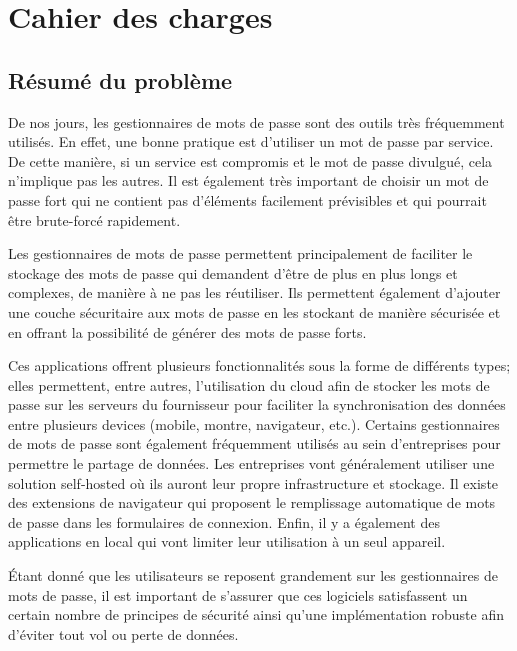 

\chapter{Cahier des charges}



\section*{Résumé du problème}
De nos jours, les gestionnaires de mots de passe sont des outils très fréquemment utilisés. En effet, une bonne pratique est d'utiliser un mot de passe par service. De cette manière, si un service est compromis et le mot de passe divulgué, cela n'implique pas les autres. Il est également très important de choisir un mot de passe fort qui ne contient pas d'éléments facilement prévisibles et qui pourrait être brute-forcé rapidement. 

Les gestionnaires de mots de passe permettent principalement de faciliter le stockage des mots de passe qui demandent d'être de plus en plus longs et complexes, de manière à ne pas les réutiliser. Ils permettent également d'ajouter une couche sécuritaire aux mots de passe en les stockant de manière sécurisée et en offrant la possibilité de générer des mots de passe forts.

Ces applications offrent plusieurs fonctionnalités sous la forme de différents types;  elles permettent, entre autres, l'utilisation du cloud afin de stocker les mots de passe sur les serveurs du fournisseur pour faciliter la synchronisation des données entre plusieurs devices (mobile, montre, navigateur, etc.). Certains gestionnaires de mots de passe sont également fréquemment utilisés au sein d'entreprises pour permettre le partage de données. Les entreprises vont généralement utiliser une solution self-hosted où ils auront leur propre infrastructure et stockage. Il existe des extensions de navigateur  qui proposent le remplissage automatique de mots de passe dans les formulaires de connexion. Enfin, il y a également des applications en local qui vont limiter leur utilisation à un seul appareil.

Étant donné que les utilisateurs se reposent grandement sur les gestionnaires de mots de passe, il est important de s'assurer que ces logiciels satisfassent un certain nombre de principes de sécurité ainsi qu'une implémentation robuste afin d'éviter tout vol ou perte de données. 

